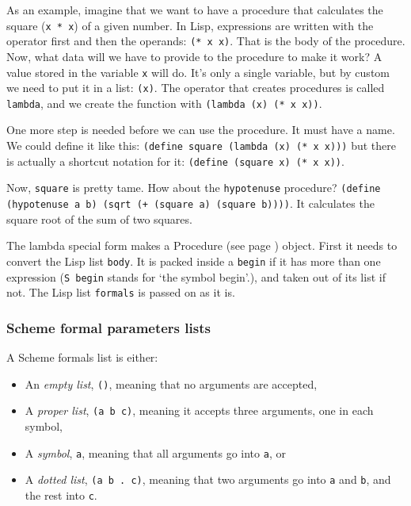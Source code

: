 \documentclass[twoside,9pt]{report}
\begin{document}
As an example, imagine that we want to have a procedure that calculates the square (\texttt{x * x}) of a given number. In Lisp, expressions are written with the operator first and then the operands: \texttt{(* x x)}. That is the body of the procedure. Now, what data will we have to provide to the procedure to make it work? A value stored in the variable \texttt{x} will do. It's only a single variable, but by custom we need to put it in a list: \texttt{(x)}. The operator that creates procedures is called \texttt{lambda}, and we create the function with \texttt{(lambda (x) (* x x))}.


One more step is needed before we can use the procedure. It must have a name. We could define it like this: \texttt{(define square (lambda (x) (* x x)))} but there is actually a shortcut notation for it: \texttt{(define (square x) (* x x))}.


Now, \texttt{square} is pretty tame. How about the \texttt{hypotenuse} procedure? \texttt{(define (hypotenuse a b) (sqrt (+ (square a) (square b))))}. It calculates the square root of the sum of two squares.


The lambda special form makes a Procedure (see page \pageref{control}) object. First it needs to convert the Lisp list \texttt{body}. It is packed inside a \texttt{begin} if it has more than one expression (\texttt{S begin} stands for `the symbol begin'.), and taken out of its list if not. The Lisp list \texttt{formals} is passed on as it is.


\begin{pulledtext}
\subsubsection{Scheme formal parameters lists}
\label{scheme-formal-parameters-lists}


A Scheme formals list is either:

\begin{itemize}
\item  An \emph{empty list}, \texttt{()}, meaning that no arguments are accepted,
\item  A \emph{proper list}, \texttt{(a b c)}, meaning it accepts three arguments, one in each symbol,
\item  A \emph{symbol}, \texttt{a}, meaning that all arguments go into \texttt{a}, or
\item  A \emph{dotted list}, \texttt{(a b . c)}, meaning that two arguments go into \texttt{a} and \texttt{b}, and the rest into \texttt{c}.
\end{itemize}
\end{pulledtext}
\end{document}
